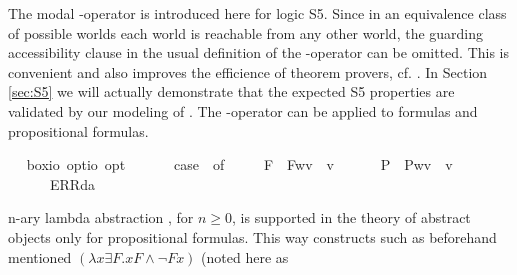 \begin{isabellebody}
\begin{isamarkuptext}%
The modal \isa{\isactrlbold {\isasymbox}}-operator is introduced here for logic S5. Since in an equivalence class
  of possible worlds each world is reachable from any other world, the guarding accessibility clause
  in the usual definition of the \isa{\isactrlbold {\isasymbox}}-operator can be omitted. This is convenient and also
  improves the efficience of theorem provers, cf. \cite{C55}.  
  In Section \ref{sec:S5} we will actually demonstrate that the expected S5 properties
  are validated by our modeling of \isa{\isactrlbold {\isasymbox}}.  The \isa{\isactrlbold {\isasymbox}}-operator can be applied to 
  formulas  and propositional formulas.%
\end{isamarkuptext}\isamarkuptrue%
\ \isamarkupfalse%
\ box{\isacharcolon}{\isacharcolon}{\isachardoublequoteopen}io\ opt{\isasymRightarrow}io\ opt{\isachardoublequoteclose}\ {\isacharparenleft}{\isachardoublequoteopen}\isactrlbold {\isasymbox}{\isacharunderscore}{\isachardoublequoteclose}\ {\isacharbrackleft}{}{}{\isacharbrackright}\ {}{}{\isacharparenright}\ \ {\isachardoublequoteopen}\isactrlbold {\isasymbox}{\isasymphi}\ {\isasymequiv}\ case\ {\isasymphi}\ of\ \isanewline
\ \ \ \ F{\isacharparenleft}{\isasympsi}{\isacharparenright}\ {\isasymRightarrow}\ F{\isacharparenleft}{\isasymlambda}w{\isachardot}{\isasymforall}v{\isachardot}\ {\isasympsi}\ v{\isacharparenright}\ {\isacharbar}\ \isanewline
\ \ \ \ P{\isacharparenleft}{\isasympsi}{\isacharparenright}\ {\isasymRightarrow}\ P{\isacharparenleft}{\isasymlambda}w{\isachardot}{\isasymforall}v{\isachardot}\ {\isasympsi}\ v{\isacharparenright}\ {\isacharbar}\ \isanewline
\ \ \ \ {\isacharunderscore}\ {\isasymRightarrow}\ ERR{\isacharparenleft}da{\isacharparenright}{\isachardoublequoteclose}%
\begin{isamarkuptext}%
n-ary lambda abstraction , for $n\geq 0$, is supported in the theory of abstract 
  objects only for propositional formulas. This way constructs such as 
  beforehand mentioned $(\lambda x \exists F. xF \wedge \neg Fx)$  (noted here as  

\end{isamarkuptext}
\end{isabellebody}
